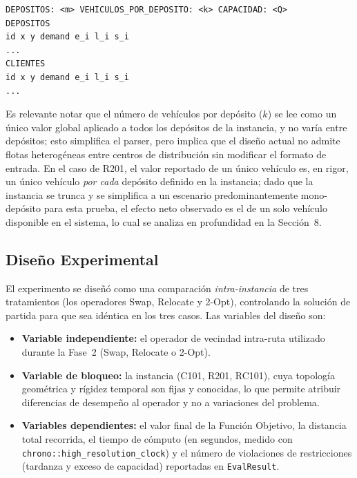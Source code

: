 \documentclass[letter, 10pt]{article}
\begin{document}
\begin{verbatim}
DEPOSITOS: <m> VEHICULOS_POR_DEPOSITO: <k> CAPACIDAD: <Q>
DEPOSITOS
id x y demand e_i l_i s_i
...
CLIENTES
id x y demand e_i l_i s_i
...
\end{verbatim}

Es relevante notar que el n\'umero de veh\'iculos por dep\'osito ($k$) se lee como un \'unico valor global aplicado a todos los dep\'ositos de la instancia, y no var\'ia entre dep\'ositos; esto simplifica el parser, pero implica que el dise\~no actual no admite flotas heterog\'eneas entre centros de distribuci\'on sin modificar el formato de entrada. En el caso de R201, el valor reportado de un \'unico veh\'iculo es, en rigor, un \'unico veh\'iculo \textit{por cada} dep\'osito definido en la instancia; dado que la instancia se trunca y se simplifica a un escenario predominantemente mono-dep\'osito para esta prueba, el efecto neto observado es el de un solo veh\'iculo disponible en el sistema, lo cual se analiza en profundidad en la Secci\'on~8.

\subsection{Dise\~no Experimental}

El experimento se dise\~n\'o como una comparaci\'on \textit{intra-instancia} de tres tratamientos (los operadores Swap, Relocate y 2-Opt), controlando la soluci\'on de partida para que sea id\'entica en los tres casos. Las variables del dise\~no son:

\begin{itemize}
\item \textbf{Variable independiente:} el operador de vecindad intra-ruta utilizado durante la Fase~2 (Swap, Relocate o 2-Opt).
\item \textbf{Variable de bloqueo:} la instancia (C101, R201, RC101), cuya topolog\'ia geom\'etrica y r\'igidez temporal son fijas y conocidas, lo que permite atribuir diferencias de desempe\~no al operador y no a variaciones del problema.
\item \textbf{Variables dependientes:} el valor final de la Funci\'on Objetivo, la distancia total recorrida, el tiempo de c\'omputo (en segundos, medido con \texttt{chrono::high\_resolution\_clock}) y el n\'umero de violaciones de restricciones (tardanza y exceso de capacidad) reportadas en \texttt{EvalResult}.
\end{itemize}
\end{document}
